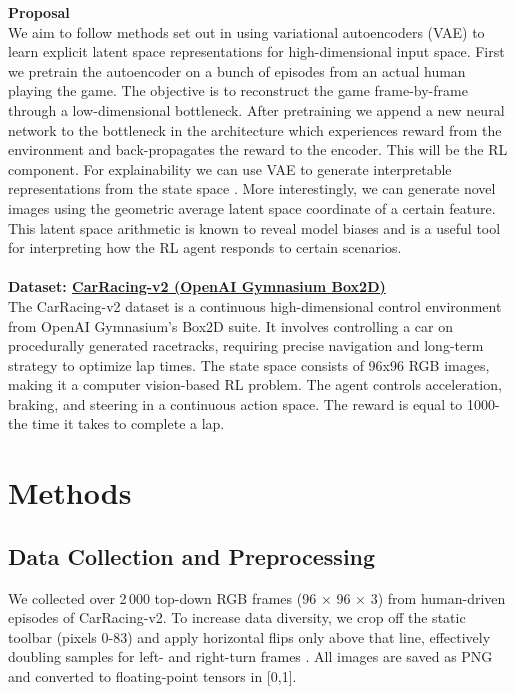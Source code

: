 \documentclass[12pt]{article}
\begin{document}
\noindent \textbf{Proposal}\\
We aim to follow methods set out in \cite{gebauer_pitfall_2021} using variational autoencoders (VAE) to learn explicit latent space representations for high-dimensional input space.
First we pretrain the autoencoder on a bunch of episodes from an actual human playing the game.
The objective is to reconstruct the game frame-by-frame through a low-dimensional bottleneck. 
After pretraining we append a new neural network to the bottleneck in the architecture which experiences reward from the environment and back-propagates the reward to the encoder.
This will be the RL component.
For explainability we can use VAE to generate interpretable representations from the state space \cite{white_sampling_2016}.
More interestingly, we can generate novel images using the geometric average latent space coordinate of a certain feature. 
This latent space arithmetic is known to reveal model biases and is a useful tool for interpreting how the RL agent responds to certain scenarios.
\\\\
\noindent \textbf{Dataset: \href{https://gymnasium.farama.org/environments/box2d/car_racing/}{CarRacing-v2 (OpenAI Gymnasium Box2D)}}\\
The CarRacing-v2 dataset is a continuous high-dimensional control environment from OpenAI Gymnasium’s Box2D suite. It involves controlling a car on procedurally generated racetracks, requiring precise navigation and long-term strategy to optimize lap times. The state space consists of 96x96 RGB images, making it a computer vision-based RL problem. The agent controls acceleration, braking, and steering in a continuous action space. The reward is equal to 1000-the time it takes to complete a lap.

\section{Methods}

\subsection{Data Collection and Preprocessing}
We collected over 2\,000 top-down RGB frames (96 $\times$ 96 $\times$ 3) from human-driven episodes of CarRacing-v2.  To increase data diversity, we crop off the static toolbar (pixels 0-83) and apply horizontal flips only above that line, effectively doubling samples for left- and right-turn frames \cite{ioffe_batch_2015, klimov_gymnasium_nodate}.  All images are saved as PNG and converted to floating-point tensors in [0,1].
\end{document}
